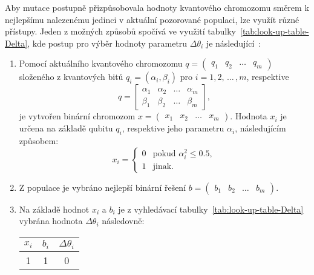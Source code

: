 Aby mutace postupně přizpůsobovala hodnoty kvantového chromozomu směrem k nejlepšímu nalezenému jedinci v aktuální pozorované populaci, lze využít různé přístupy. 
Jeden z možných způsobů spočívá ve využití tabulky~\ref{tab:look-up-table-Delta}, kde postup pro výběr hodnoty parametru $\Delta\theta_i$ je následující~\cite{NaturalComputing}:
\begin{enumerate}
    \item Pomocí aktuálního kvantového chromozomu $q = \begin{pmatrix} q_1 & q_2 & \dots & q_m \end{pmatrix}$ složeného z kvantových bitů $ q_i = \left( \alpha_i, \beta_i \right)$ pro $i=1,2,\,\dots\,,m$, respektive
        \begin{equation*}
            q =
            \begin{bmatrix}
                \alpha_1 & \alpha_2 & \dots & \alpha_m \\
                \beta_1  & \beta_2  & \dots & \beta_m
            \end{bmatrix},
        \end{equation*}
        je vytvořen binární chromozom $x = \begin{pmatrix} x_1 & x_2 & \dots & x_m \end{pmatrix}$.
        Hodnota $x_i$ je určena na základě qubitu $q_i$, respektive jeho parametru $\alpha_i$, následujícím způsobem:
        \begin{equation*}
            x_i =
            \begin{cases} 
                0 & \text{pokud } \alpha_i^2 \leq 0.5, \\
                1 & \text{jinak}.
            \end{cases}
        \end{equation*}
    \item Z populace je vybráno nejlepší binární řešení $b = \begin{pmatrix} b_1 & b_2 & \dots & b_m \end{pmatrix}$.
    \item Na základě hodnot $x_i$ a $b_i$ je z vyhledávací tabulky~\ref{tab:look-up-table-Delta} vybrána hodnota $\Delta\theta_i$ následovně:
        \begin{table}[ht!]
            \centering
            \begin{tabular}{|c c|c|}
            \hline
            $x_i$ & $b_i$ & $\Delta\theta_i$ \\
            \hline
            1     & 1     & 0                \\ 

\end{tabular}
\end{table}
\end{enumerate}
